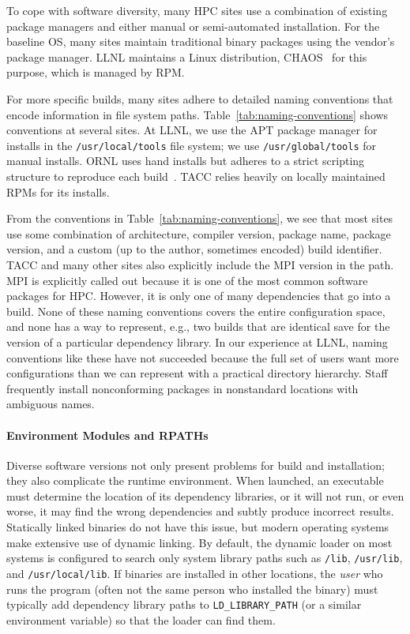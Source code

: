 To cope with software diversity, many HPC sites use a combination of existing
package managers and either manual or semi-automated installation.
For the baseline OS, many sites maintain traditional binary
packages using the vendor's package manager. LLNL maintains a Linux
distribution, CHAOS~\cite{chaos} for this purpose, which is managed by RPM.

For more specific builds, many sites adhere to detailed naming conventions
that encode information in file system paths.
Table~\ref{tab:naming-conventions} shows conventions
at several sites. At LLNL, we use the APT package manager for installs
in the {\tt /usr/local/tools} file system; we use {\tt /usr/global/tools}
for manual installs.
ORNL uses hand installs but adheres to a strict scripting structure
to reproduce each build~\cite{jones+:cug08}.
TACC relies heavily on locally maintained RPMs for its installs.

From the conventions in Table~\ref{tab:naming-conventions},
we see that most sites use some combination of architecture, compiler version,
package name, package version, and a custom (up to the author, sometimes
encoded) build identifier.  TACC and many other sites also explicitly
include the MPI version in the path. MPI is explicitly called out
because it is one of the most common software packages for HPC.
However, it is only one of many dependencies that go into a build.
None of these naming conventions covers the entire configuration
space, and none has a way to represent, e.g., two builds that are identical
save for the version of a particular dependency library.  In our experience
at LLNL, naming conventions like these have not succeeded because the full
set of users want more configurations than we can represent with a practical
directory hierarchy. Staff frequently install nonconforming packages
in nonstandard locations with ambiguous names.

\paragraph{Environment Modules and RPATHs}\label{sec:env-rpath}

Diverse software versions not only present problems for build and installation;
they also complicate the runtime environment. When launched, an executable
must determine the location of its dependency libraries, or it will not run,
or even worse, it may find the wrong dependencies and subtly produce incorrect results.
Statically linked binaries do not have this issue, but modern
operating systems make extensive use of dynamic linking.
By default, the dynamic loader on most systems is configured to search only
system library paths such as {\tt /lib}, {\tt /usr/lib}, and
{\tt /usr/local/lib}.  If binaries are installed in other locations, the
{\it user} who runs the program (often not the same person who
installed the binary) must typically add dependency library paths to
{\tt LD\_LIBRARY\_PATH} (or a similar environment variable) so that the loader
can find them.

